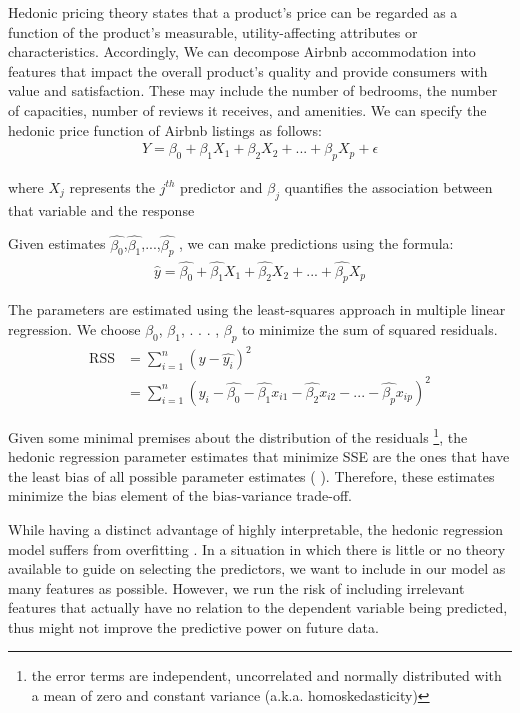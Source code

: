 Hedonic pricing theory states that a product's price can be regarded as a
function of the product's measurable, utility-affecting attributes or
characteristics.  Accordingly, We can decompose Airbnb accommodation into
features that impact the overall product's quality and provide consumers with
value and satisfaction.  These may include the number of bedrooms, the number of
capacities, number of reviews it receives, and amenities.
We can specify the hedonic price function of Airbnb listings as follows:
\begin{eqnarray}
    Y = \beta_0 + \beta_1 X_1 + \beta_2 X_2 + ... + \beta_p X_p + \epsilon
\end{eqnarray}

where $X_j$ represents the $j^{th}$ predictor and $\beta_j$ quantifies the
association between that variable and the response

Given estimates $\hat{\beta_0}$,$\hat{\beta_1}$,...,$\hat{\beta_p}$ , we can
make predictions using the formula:
\begin{eqnarray}
  \hat{y} = \hat{\beta_0} + \hat{\beta_1} X_1 + \hat{\beta_2} X_2 + ... + \hat{\beta_p} X_p
\end{eqnarray}

The parameters are estimated using the least-squares approach in multiple linear
regression. We choose $\beta_0$, $\beta_1$, . . . , $\beta_p$ to minimize the
sum of squared residuals.
\begin{equation}
\begin{split}
\textrm{RSS} & = \sum_{i=1}^{n}(y-\hat{y_i})^2 \\
   & =\sum_{i=1}^{n}(y_i - \hat{\beta_0} - \hat{\beta_1} x_{i1} - \hat{\beta_2} x_{i2} - ... - \hat{\beta_p} x_{ip})^2
\end{split}
\end{equation}

Given some minimal premises about the distribution of the residuals \footnote{
the error terms are independent, uncorrelated and normally distributed with a
mean of zero and constant variance  (a.k.a. homoskedasticity)}, the hedonic
regression parameter estimates that
minimize SSE are the ones that have the least bias of all possible parameter
estimates (\textcite{graybill1976theory} ). Therefore, these estimates minimize
the bias element of the bias-variance trade-off.

While having a distinct advantage of highly interpretable, the hedonic
regression model suffers from overfitting \parencite{harrell2015regression}.
In a situation in which  there is little or no theory available to guide on
selecting the predictors, we want to include in our model as many features as
possible.  However, we run the risk of including irrelevant features that
actually have no relation to the dependent variable being predicted, thus might
not improve the predictive power on future data.

